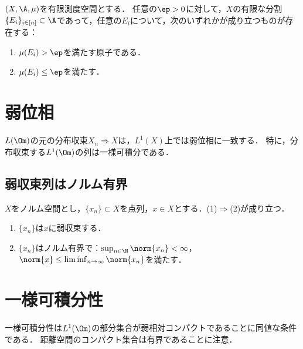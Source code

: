 \documentclass[uplatex,dvipdfmx]{jsreport}
\begin{document}
\begin{theorem}[Saks]
    $(X,\A,\mu)$を有限測度空間とする．
    任意の$\ep>0$に対して，$X$の有限な分割$\{E_i\}_{i\in[n]}\subset\A$であって，任意の$E_i$について，次のいずれかが成り立つものが存在する：
    \begin{enumerate}
        \item $\mu(E_i)>\ep$を満たす原子である．
        \item $\mu(E_i)\le\ep$を満たす．
    \end{enumerate}
\end{theorem}

\section{弱位相}

\begin{tcolorbox}[colframe=ForestGreen, colback=ForestGreen!10!white,breakable,colbacktitle=ForestGreen!40!white,coltitle=black,fonttitle=\bfseries\sffamily,
title=]
    $L(\Om)$の元の分布収束$X_n\Rightarrow X$は，$L^1(X)$上では弱位相に一致する．
    特に，分布収束する$L^1(\Om)$の列は一様可積分である．
\end{tcolorbox}

\subsection{弱収束列はノルム有界}

\begin{theorem}[ノルム空間の弱収束の必要条件]
    $X$をノルム空間とし，$\{x_n\}\subset X$を点列，$x\in X$とする．(1)$\Rightarrow$(2)が成り立つ．
    \begin{enumerate}
        \item $\{x_n\}$は$x$に弱収束する．
        \item $\{x_n\}$はノルム有界で：$\sup_{n\in\N}\norm{x_n}<\infty$，$\norm{x}\le\liminf_{n\to\infty}\norm{x_n}$を満たす．
    \end{enumerate}
\end{theorem}

\section{一様可積分性}

\begin{tcolorbox}[colframe=ForestGreen, colback=ForestGreen!10!white,breakable,colbacktitle=ForestGreen!40!white,coltitle=black,fonttitle=\bfseries\sffamily,
title=]
    一様可積分性は$L^1(\Om)$の部分集合が弱相対コンパクトであることに同値な条件である．
    距離空間のコンパクト集合は有界であることに注意．
\end{tcolorbox}
\end{document}
